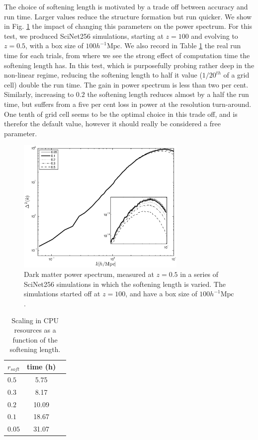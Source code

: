 \documentclass[useAMS,usenatbib]{mn2e}
\begin{document}
The choice of softening length is motivated by a trade off between accuracy and run time.
 Larger values reduce the structure formation but run quicker. 
 We show in Fig. \ref{fig:rsoft} the impact of changing this parameters on the power spectrum.
 For this test, we produced SciNet256 simulations, starting at $z=100$ and evolving to $z=0.5$, with a box size of $100 h^{-1}\mbox{Mpc}$.
 We also record in Table \ref{table:rsoft} the real run time for each trials, from where 
we see the strong effect of computation time the softening length has.
In this test, which is purposefully probing rather deep in the non-linear regime, reducing the softening length
to half it value ($1/20^{th}$ of a grid cell) double the run time. The gain in power spectrum is less than two per cent.
Similarly, increasing to $0.2$ the softening length reduces almost by a half the run time, but suffers from a five per cent loss in power at the resolution turn-around.
One tenth of grid cell seems to be the optimal choice in this trade off, and is therefor the default value, however it should really be considered a free parameter.


\begin{figure}%
  \begin{center}
    \includegraphics[width=3.2in]{graphs/power_rsoft.eps}
  \caption{Dark matter power spectrum, measured at $z=0.5$ in a series of SciNet256 simulations in which the softening length is varied.
  The simulations started off at $z= 100$, and have a box size of $100 h^{-1}\mbox{Mpc}$.
    \label{fig:rsoft}}
\end{center}
\end{figure}

\begin{table}
\begin{center}
\caption{Scaling in {\small CPU} resources as a function of the softening length.}
\begin{tabular}{|l|c|c|}
\hline 
$r_{soft}$         & time (h)   \\                 
\hline
 $0.5$ & 5.75 \\
 $0.3$ & 8.17\\
 $0.2$ & 10.09 \\
 $0.1$ & 18.67\\
 $0.05$ & 31.07 \\
\hline
\end{tabular}
\label{table:rsoft}
\end{center}
\end{table}
\end{document}
